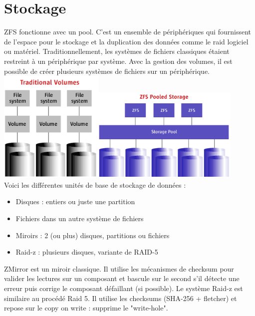\documentclass[a4paper]{report}
\begin{document}
	\section{Stockage}
	ZFS fonctionne avec un pool. C'est un ensemble de périphériques qui fournissent de l’espace pour le stockage et la duplication des données comme le raid logiciel ou matériel. Traditionnellement, les systèmes de fichiers classiques étaient restreint à un périphérique par système. Avec la gestion des volumes, il est possible de créer plusieurs systèmes de fichiers sur un périphérique.\\
	\includegraphics[width=5cm]{volumes_tradicionais.png}\includegraphics[width=7cm]{armazenamento_pooled_zfs.png}\\

	Voici les différentes unités de base de stockage de données :\\
	\begin{itemize}
		 \item Disques : entiers ou juste une partition
		 \item Fichiers dans un autre système de fichiers
		 \item Miroirs : 2 (ou plus) disques, partitions ou fichiers
		 \item Raid-z : plusieurs disques, variante de RAID-5\\
	\end{itemize}
	ZMirror est un miroir classique. Il utilise les mécanismes de checksum pour valider les lectures sur un composant et bascule sur le second s'il détecte une erreur puis corrige le composant défaillant (si possible). Le système Raid-z est similaire au procédé Raid 5. Il utilise les checksums (SHA-256 + fletcher) et repose sur le copy on write : supprime le "write-hole".
\end{document}
